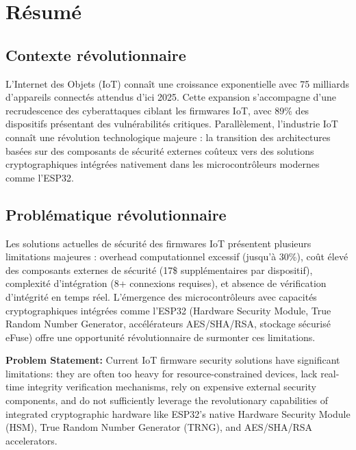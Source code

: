 
\chapter*{Résumé}

\section*{Contexte révolutionnaire}

L'Internet des Objets (IoT) connaît une croissance exponentielle avec 75 milliards d'appareils connectés attendus d'ici 2025. Cette expansion s'accompagne d'une recrudescence des cyberattaques ciblant les firmwares IoT, avec 89\% des dispositifs présentant des vulnérabilités critiques. Parallèlement, l'industrie IoT connaît une révolution technologique majeure : la transition des architectures basées sur des composants de sécurité externes coûteux vers des solutions cryptographiques intégrées nativement dans les microcontrôleurs modernes comme l'ESP32.

\section*{Problématique révolutionnaire}

Les solutions actuelles de sécurité des firmwares IoT présentent plusieurs limitations majeures : overhead computationnel excessif (jusqu'à 30\%), coût élevé des composants externes de sécurité (17\$ supplémentaires par dispositif), complexité d'intégration (8+ connexions requises), et absence de vérification d'intégrité en temps réel. L'émergence des microcontrôleurs avec capacités cryptographiques intégrées comme l'ESP32 (Hardware Security Module, True Random Number Generator, accélérateurs AES/SHA/RSA, stockage sécurisé eFuse) offre une opportunité révolutionnaire de surmonter ces limitations.

\textbf{Problem Statement:} Current IoT firmware security solutions have significant limitations: they are often too heavy for resource-constrained devices, lack real-time integrity verification mechanisms, rely on expensive external security components, and do not sufficiently leverage the revolutionary capabilities of integrated cryptographic hardware like ESP32's native Hardware Security Module (HSM), True Random Number Generator (TRNG), and AES/SHA/RSA accelerators.

